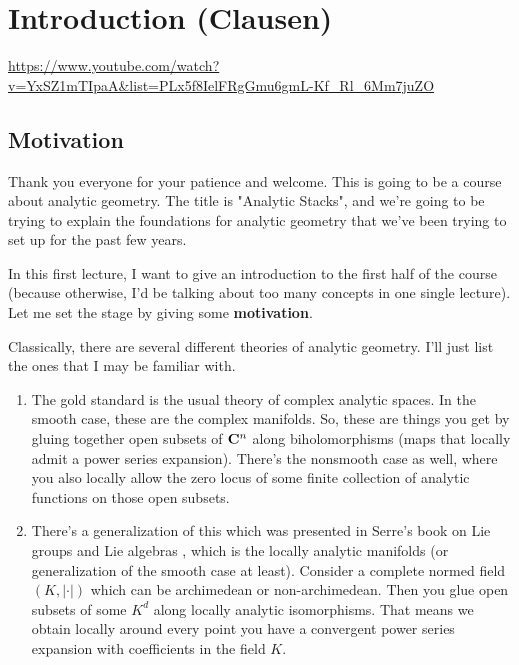 
\section{\ufs Introduction (Clausen)}

\url{https://www.youtube.com/watch?v=YxSZ1mTIpaA&list=PLx5f8IelFRgGmu6gmL-Kf_Rl_6Mm7juZO}
\renewcommand{\yt}[2]{\href{https://www.youtube.com/watch?v=YxSZ1mTIpaA&list=PLx5f8IelFRgGmu6gmL-Kf_Rl_6Mm7juZO&t=#1}{#2}}
\vspace{1em}



\subsection{Motivation}

Thank you everyone for your patience and welcome. This is going to be a course about analytic geometry. The title is "Analytic Stacks", and we're going to be trying to explain the foundations for analytic geometry that we've been trying to set up for the past few years. 

In this first lecture, I want to give an introduction to the first half of the course (because otherwise, I'd be talking about too many concepts in one single lecture). Let me set the stage by giving some \textbf{motivation}.

Classically, there are several different theories of analytic geometry. I'll just list the ones that I may be familiar with. 

\begin{enumerate}
    \item The gold standard is the usual theory of complex analytic spaces. In the smooth case, these are the complex manifolds. So, these are things you get by gluing together open subsets of $\mathbf C^n$ along biholomorphisms (maps that locally admit a power series expansion). There's the nonsmooth case as well, where you also locally allow the zero locus of some finite collection of analytic functions on those open subsets.


    \item There's a generalization of this which was presented in Serre's book on Lie groups and Lie algebras \citeme{}, which is the locally analytic manifolds (or generalization of the smooth case at least). Consider a complete normed field $(K, |\cdot|)$ which can be archimedean or non-archimedean. Then you glue open subsets of some $K^d$ along locally analytic isomorphisms. That means we obtain locally around every point you have a convergent power series expansion with coefficients in the field $K$. 
\end{enumerate}
 



